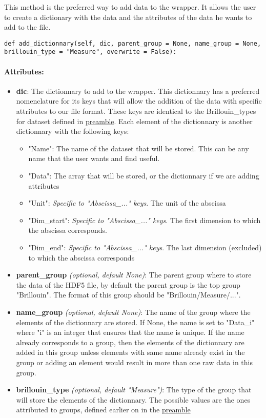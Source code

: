 This method is the preferred way to add data to the wrapper. It allows the user to create a dictionary with the data and the attributes of the data he wants to add to the file. 

\begin{lstlisting}
def add_dictionnary(self, dic, parent_group = None, name_group = None, brillouin_type = "Measure", overwrite = False):
\end{lstlisting}

\paragraph{Attributes:}

\begin{itemize}
    \item \textbf{dic}: The dictionnary to add to the wrapper. This dictionnary has a preferred nomenclature for its keys that will allow the addition of the data with specific attributes to our file format. These keys are identical to the Brillouin\_types for dataset defined in \hyperref[subsec:preamble.file_structure.complete_structure]{preamble}. Each element of the dictionnary is another dictionnary with the following keys:
    \begin{itemize}
        \item "Name": The name of the dataset that will be stored. This can be any name that the user wants and find useful.
        \item "Data": The array that will be stored, or the dictionnary if we are adding attributes
        \item "Unit": \textit{Specific to "Abscissa\_..." keys}. The unit of the abscissa
        \item "Dim\_start": \textit{Specific to "Abscissa\_..." keys}. The first dimension to which the abscissa corresponds.
        \item "Dim\_end": \textit{Specific to "Abscissa\_..." keys}. The last dimension (excluded) to which the abscissa corresponds
    \end{itemize}
    \item \textbf{parent\_group} \textit{(optional, default None)}: The parent group where to store the data of the HDF5 file, by default the parent group is the top group "Brillouin". The format of this group should be "Brillouin/Measure/...". 
    \item \textbf{name\_group} \textit{(optional, default None)}: The name of the group where the elements of the dictionnary are stored. If None, the name is set to "Data\_i" where "i" is an integer that ensures that the name is unique. If the name already corresponds to a group, then the elements of the dictionnary are added in this group unless elements with same name already exist in the group or adding an element would result in more than one raw data in this group. 
    \item \textbf{brillouin\_type} \textit{(optional, default "Measure")}: The type of the group that will store the elements of the dictionnary. The possible values are the ones attributed to groups, defined earlier on in the \hyperref[subsec:preamble.file_structure.complete_structure]{preamble}
\end{itemize}

